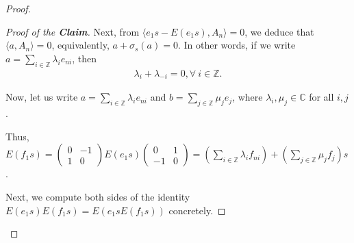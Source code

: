 \documentclass[12pt]{amsart}
\theoremstyle{definition}
\theoremstyle{remark}
\begin{document}
\begin{proof}
\begin{proof}[Proof of the \textbf{Claim}]
Next, from $\langle e_1s-E(e_1s), A_n \rangle=0$, we deduce that $\langle a, A_n \rangle=0$, equivalently, $a+\sigma_s(a)=0$. In other words, if we write $a=\sum_{i\in\mathbb{Z}}\lambda_ie_{ni}$, then 
\begin{align}\label{eq: skew-symmetry on the coefficients of a}
\lambda_i+\lambda_{-i}=0,\forall~i\in\mathbb{Z}. 
\end{align}

Now, let us write $a=\sum_{i\in\mathbb{Z}}\lambda_ie_{ni}$ and $b=\sum_{j\in\mathbb{Z}}\mu_je_j$, where $\lambda_i,\mu_j\in \mathbb{C}$ for all $i, j$.

Thus, $E(f_1s)=\begin{pmatrix}
0&-1\\
1&0
\end{pmatrix} E(e_1s)\begin{pmatrix}
0&1\\
-1&0
\end{pmatrix} =(\sum_{i\in\mathbb{Z}}\lambda_if_{ni})+(\sum_{j\in\mathbb{Z}}\mu_jf_j)s$.

Next, we compute both sides of the identity $E(e_1s)E(f_1s)=E(e_1sE(f_1s))$ concretely.


\end{proof}
\end{proof}
\end{document}

